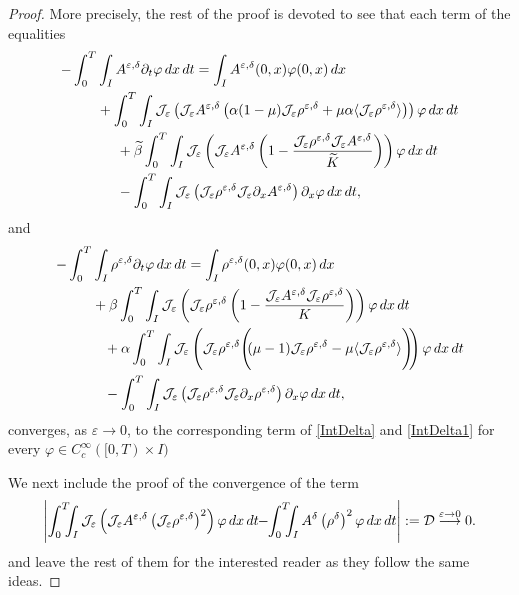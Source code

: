 \documentclass[12pt]{amsart}
\newcommand{\Jrho}{\mathcal{J_\varepsilon}\rho^{\varepsilon,\delta}}
\newcommand{\Jrhouno}{\mathcal{J_\varepsilon} \partial_x\rho^{\varepsilon,\delta}}
\newcommand{\JA}{\mathcal{J_\varepsilon}A^{\varepsilon,\delta}}
\newcommand{\JAuno}{\mathcal{J_\varepsilon}\partial_x A^{\varepsilon,\delta}}
\newcommand{\rhoed}{\rho^{\varepsilon,\delta}}
\newcommand{\Aed}{A^{\varepsilon,\delta}}
\newcommand{\D}{\,d}
\begin{document}
\begin{proof}
More precisely, the rest of the proof is devoted to see that each term of the equalities
\begin{equation*}
	\begin{split}
		-\int_{0}^T&\int_{I}\Aed \partial_t \varphi \D x \D t = \int_{I}\Aed (0,x)\varphi (0,x)\D x\\
        &+ \int_{0}^T\int_{I} \mathcal{J_\varepsilon}\left( \JA\left(\alpha(1-\mu)\Jrho+\mu\alpha \langle \Jrho \rangle \right)\right)  \varphi \D x \D t   \\
		&\hspace{0.5cm}+\widetilde{\beta}\int_{0}^T\int_{I} \mathcal{J_\varepsilon}\left( \JA\left(1-\frac{\Jrho \JA}{\widetilde{K}}\right)\right) \varphi \D x \D t \\
		&\hspace{0.5cm}-\int_{0}^T\int_{I} \mathcal{J_\varepsilon}\left( \Jrho\JAuno\right)\partial_{x}\varphi \D x \D t,\\
		 \end{split}
\end{equation*}
and
\begin{equation*}
        \begin{split}
-\int_{0}^T&\int_{I}\rhoed \partial_t \varphi \D x \D t	= \int_{I}\rhoed (0,x) \varphi (0,x) \D x \\
&+\beta\int_{0}^T\int_{I}\mathcal{J_\varepsilon}\left( \Jrho  \left(1-\frac{\JA\Jrho}{K} \right)\right) \varphi \D x \D t \\	&\hspace{0.3cm}+\alpha\int_{0}^T\int_{I}\mathcal{J_\varepsilon}\left( \Jrho\Bigg( \hspace{-0.1cm}(\mu-1)\Jrho-\mu\langle \Jrho\rangle\Bigg)\hspace{-0.1cm}\right) \varphi \D x \D t\\
		&\hspace{0.3cm}-\int_{0}^T\int_{I}\mathcal{J_\varepsilon}\left( \Jrho\Jrhouno\right) \partial_{x}\varphi \D x \D t,\\
	\end{split}
\end{equation*}
converges, as $\varepsilon \to 0$, to the corresponding term of  \eqref{IntDelta} and \eqref{IntDelta1} for every $\varphi\in C^\infty_c([0,T)\times I)$





We next include  the proof of the convergence of the term 
\begin{equation*}
    \left|\int_{0}^T\hspace{-0.2cm}\int_{I}\mathcal{J_\varepsilon}\left(   \JA\left(\Jrho \right)^2\right) \varphi \D x \D t\hspace{-0.1cm}-\hspace{-0.1cm} \int_{0}^T\hspace{-0.2cm}\int_{I}  A^\delta\left(\rho^\delta \right)^2 \varphi \D x \D t\right|:=\mathcal{D}\overset{\varepsilon\to0}{\longrightarrow}0.
\end{equation*}
and leave the rest of them for the interested reader as they follow the same ideas.



\end{proof}
\end{document}
